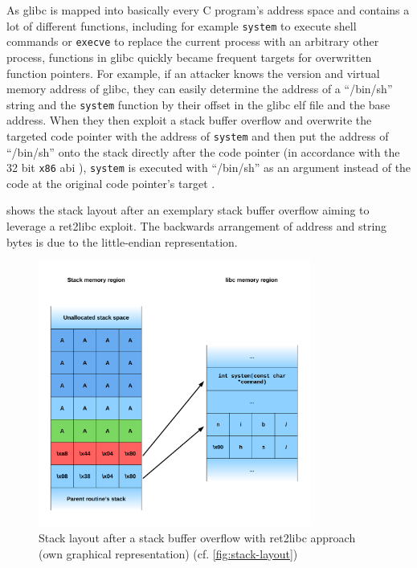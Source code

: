 As \gls{glibc} is mapped into basically every C program's address space and contains a lot of different functions, including for example \texttt{system} to execute shell commands or \texttt{execve} to replace the current process with an arbitrary other process, functions in \gls{glibc} quickly became frequent targets for overwritten function pointers.
For example, if an attacker knows the version and virtual memory address of \gls{glibc}, they can easily determine the address of a ``/bin/sh'' string and the \texttt{system} function by their offset in the \gls{glibc} \gls{elf} file and the base address.
When they then exploit a stack buffer overflow and overwrite the targeted code pointer with the address of \texttt{system} and then put the address of ``/bin/sh'' onto the stack directly after the code pointer (in accordance with the 32 bit \texttt{x86} \gls{abi} \cites[11\psq]{Lu2015}[17\psqq]{Fog2019}), \texttt{system} is executed with ``/bin/sh'' as an argument instead of the code at the original code pointer's target \cite{SolarDesigner1997}.

 shows the stack layout after an exemplary stack buffer overflow aiming to leverage a \gls{ret2libc} exploit.
The backwards arrangement of address and string bytes is due to the little-endian representation.

\begin{figure}[htb]
	\centering
	\includegraphics[width=0.8\textwidth]{figures/ret2libc}
	\caption{Stack layout after a stack buffer overflow with \acrshort{ret2libc} approach (own graphical representation) (cf. \cref{fig:stack-layout})}
	\label{fig:ret2libc}
\end{figure}


